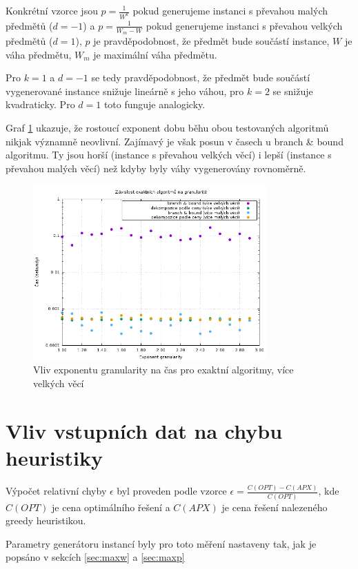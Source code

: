 \documentclass[11pt]{article}
\begin{document}
Konkrétní vzorce jsou $p = \frac{1}{W^k}$ pokud generujeme instanci s převahou malých předmětů ($d = -1$) a 
$p = \frac{1}{W_m - W}$ pokud generujeme instanci s převahou velkých předmětů ($d = 1$), $p$ je pravděpodobnost, že předmět bude součástí instance, $W$ je váha předmětu, $W_m$ je maximální váha předmětu.

Pro $k = 1$ a $d = -1$ se tedy pravděpodobnost, že předmět bude součástí vygenerované instance snižuje lineárně s jeho váhou, pro $k = 2$ se snižuje kvadraticky. Pro $d = 1$ toto funguje analogicky.  

Graf \ref{fig:gran1} ukazuje, že rostoucí exponent dobu běhu obou testovaných algoritmů nikjak významně neovlivní. Zajímavý je však posun v časech u branch \& bound algoritmu. Ty jsou horší (instance s převahou velkých věcí) i lepší (instance s převahou malých věcí) než kdyby byly váhy vygenerovány rovnoměrně.

\begin{figure}[h!]
	\centering
    	\includegraphics[width=0.8\textwidth]{../data/gran1.png}
	\caption{Vliv exponentu granularity na čas pro exaktní algoritmy, více velkých věcí}
	\label{fig:gran1}
\end{figure}

\section{Vliv vstupních dat na chybu heuristiky}

Výpočet relativní chyby $\epsilon$ byl proveden podle vzorce $\epsilon = \frac{C(OPT) - C(APX)}{C(OPT)}$, kde 
$C(OPT)$ je cena optimálního řešení a $C(APX)$ je cena řešení nalezeného greedy heuristikou.

Parametry generátoru instancí byly pro toto měření nastaveny tak, jak je popsáno v sekcích \ref{sec:maxw} a \ref{sec:maxp}
\end{document}
